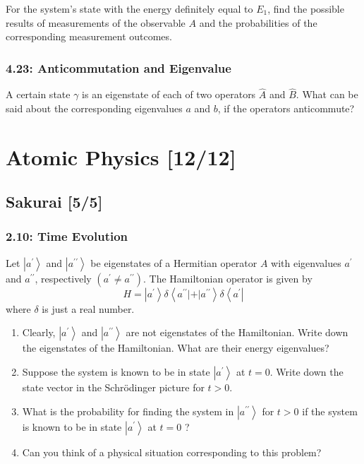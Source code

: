 \documentclass[11pt]{article}
\begin{document}
For the system's state with the energy definitely equal to \(E_1\), find the
possible results of measurements of the observable \(A\) and the probabilities of
the corresponding measurement outcomes.
\subsubsection{4.23: Anticommutation and Eigenvalue}
\label{sec:org4027b25}
A certain state \(\gamma\) is an eigenstate of each of two operators
\(\hat{A}\) and \(\hat{B}\). What can be said about the corresponding eigenvalues
\(a\) and \(b\), if the operators anticommute?
\section{Atomic Physics [12/12]}
\label{sec:orgf6122cc}
\subsection{Sakurai [5/5]}
\label{sec:org897ed6d}
\subsubsection{2.10: Time Evolution}
\label{sec:org8f710d5}
Let \(\left|a^{\prime}\right\rangle\) and \(\left|a^{\prime
\prime}\right\rangle\) be eigenstates of a Hermitian operator \(A\) with
eigenvalues \(a^{\prime}\) and \(a^{\prime \prime}\), respectively \(\left(a^{\prime}
\neq a^{\prime \prime}\right)\). The Hamiltonian operator is given by $$
H=\left|a^{\prime}\right\rangle \delta\left\langle a^{\prime \prime}|+|
a^{\prime \prime}\right\rangle \delta\left\langle a^{\prime}\right| $$ where
\(\delta\) is just a real number.
\begin{enumerate}
\item Clearly, \(\left|a^{\prime}\right\rangle\) and \(\left|a^{\prime
   \prime}\right\rangle\) are not eigenstates of the Hamiltonian. Write down the
eigenstates of the Hamiltonian. What are their energy eigenvalues?
\item Suppose the system is known to be in state \(\left|a^{\prime}\right\rangle\) at
\(t=0\). Write down the state vector in the Schrödinger picture for \(t>0\).
\item What is the probability for finding the system in \(\left|a^{\prime
   \prime}\right\rangle\) for \(t>0\) if the system is known to be in state
\(\left|a^{\prime}\right\rangle\) at \(t=0\) ?
\item Can you think of a physical situation corresponding to this problem?
\end{enumerate}
\end{document}
